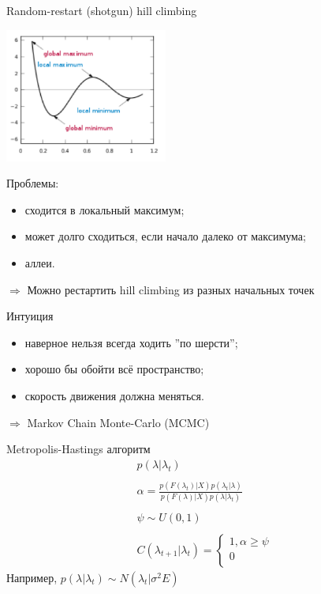 \documentclass[14pt, fleqn, xcolor={dvipsnames, table}]{beamer}
\begin{document}
\begin{frame}{Random-restart (shotgun) hill climbing}
\begin{center}
\includegraphics[width=0.4\textwidth]{hill_climb.png}
\end{center}
\footnotesize
Проблемы:
\begin{itemize}
  \item сходится в локальный максимум;
  \item может долго сходиться, если начало далеко от максимума;
  \item аллеи.
\end{itemize}
$\Rightarrow$ Можно рестартить hill climbing из разных начальных точек
\end{frame}

\begin{frame}{Интуиция}
\begin{itemize}
  \item наверное нельзя всегда ходить ''по шерсти'';
  \item хорошо бы обойти всё пространство;
  \item скорость движения должна меняться.
\end{itemize}
$\Rightarrow$ Markov Chain Monte-Carlo (MCMC)
\end{frame}

\begin{frame}{Metropolis-Hastings алгоритм}
$$\begin{array}{l}
p(\lambda|\lambda_t)\\
\\
\alpha = \frac{p(F(\lambda_t)|X)p(\lambda_t|\lambda)}{p(F(\lambda)|X)p(\lambda|\lambda_t)}\\
\\
\psi \sim U(0,1)\\
\\
C(\lambda_{t+1}|\lambda_t) = \left\{  
           \begin{array}{rcl}  
            1, \alpha \ge \psi \\  
            0 \\  
           \end{array}   
           \right.  
\end{array}$$
Например, $p(\lambda|\lambda_t) \sim N(\lambda_t|\sigma^2E)$
\end{frame}
\end{document}
